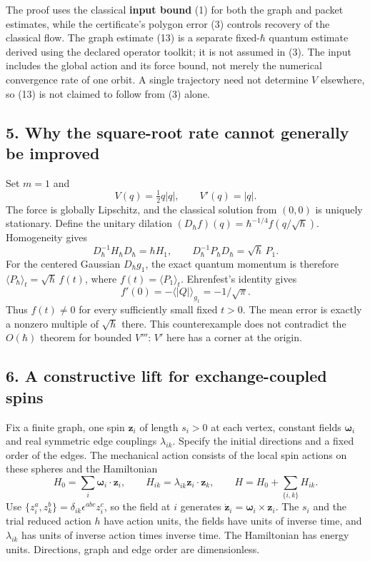 \documentclass[11pt,a4paper]{article}
\begin{document}
The proof uses the classical \textbf{input bound} (1) for both the graph
and packet estimates, while the certificate's polygon error (3) controls
recovery of the classical flow. The graph estimate (13) is a separate
fixed-\(\hbar\) quantum estimate derived using the declared operator
toolkit; it is not assumed in (3). The input includes the global action
and its force bound, not merely the numerical convergence rate of one
orbit. A single trajectory need not determine \(V\) elsewhere, so (13)
is not claimed to follow from (3) alone.

\subsection{5. Why the square-root rate cannot generally be
improved}\label{why-the-square-root-rate-cannot-generally-be-improved}

Set \(m=1\) and \[V(q)=\tfrac12q|q|,\qquad V'(q)=|q|.\tag{20}\] The
force is globally Lipschitz, and the classical solution from \((0,0)\)
is uniquely stationary. Define the unitary dilation
\((D_\hbar f)(q)=\hbar^{-1/4}f(q/\sqrt\hbar)\). Homogeneity gives
\[D_\hbar^{-1}H_\hbar D_\hbar=\hbar H_1,\qquad
 D_\hbar^{-1}P_\hbar D_\hbar=\sqrt\hbar\,P_1.\tag{21}\] For the centered
Gaussian \(D_\hbar g_1\), the exact quantum momentum is therefore
\(\langle P_\hbar\rangle_t=\sqrt\hbar\,f(t)\), where
\(f(t)=\langle P_1\rangle_t\). Ehrenfest's identity gives
\[f'(0)=-\langle |Q|\rangle_{g_1}=-1/\sqrt\pi.\tag{22}\] Thus
\(f(t)\ne0\) for every sufficiently small fixed \(t>0\). The mean error
is exactly a nonzero multiple of \(\sqrt\hbar\) there. This
counterexample does not contradict the \(O(\hbar)\) theorem for bounded
\(V'''\): \(V'\) here has a corner at the origin.

\subsection{6. A constructive lift for exchange-coupled
spins}\label{a-constructive-lift-for-exchange-coupled-spins}

Fix a finite graph, one spin \(\mathbf z_i\) of length \(s_i>0\) at each
vertex, constant fields \(\boldsymbol\omega_i\) and real symmetric edge
couplings \(\lambda_{ik}\). Specify the initial directions and a fixed
order of the edges. The mechanical action consists of the local spin
actions on these spheres and the Hamiltonian \[
 H_0=\sum_i\boldsymbol\omega_i\cdot\mathbf z_i,\qquad
 H_{ik}=\lambda_{ik}\mathbf z_i\cdot\mathbf z_k,\qquad
 H=H_0+\sum_{\{i,k\}}H_{ik}.
\] Use \(\{z_i^a,z_k^b\}=\delta_{ik}\epsilon^{abc}z_i^c\), so the field
at \(i\) generates
\(\dot{\mathbf z}_i=\boldsymbol\omega_i\times\mathbf z_i\). The \(s_i\)
and the trial reduced action \(h\) have action units, the fields have
units of inverse time, and \(\lambda_{ik}\) has units of inverse action
times inverse time. The Hamiltonian has energy units. Directions, graph
and edge order are dimensionless.
\end{document}
